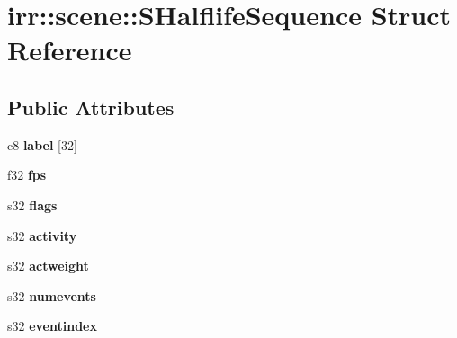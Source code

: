 \hypertarget{structirr_1_1scene_1_1_s_halflife_sequence}{\section{irr\-:\-:scene\-:\-:S\-Halflife\-Sequence Struct Reference}
\label{structirr_1_1scene_1_1_s_halflife_sequence}
}
\subsection*{Public Attributes}
\begin{DoxyCompactItemize}
\item 
\hypertarget{structirr_1_1scene_1_1_s_halflife_sequence_a8e4b2f0fbcae1e8da5a95c1e23ba1d75}{c8 {\bfseries label} \mbox{[}32\mbox{]}}\label{structirr_1_1scene_1_1_s_halflife_sequence_a8e4b2f0fbcae1e8da5a95c1e23ba1d75}

\item 
\hypertarget{structirr_1_1scene_1_1_s_halflife_sequence_a62d5452cc65df8479bbe4572c56482ee}{f32 {\bfseries fps}}\label{structirr_1_1scene_1_1_s_halflife_sequence_a62d5452cc65df8479bbe4572c56482ee}

\item 
\hypertarget{structirr_1_1scene_1_1_s_halflife_sequence_a9a511f19c947075c2ef98cb2e371e69e}{s32 {\bfseries flags}}\label{structirr_1_1scene_1_1_s_halflife_sequence_a9a511f19c947075c2ef98cb2e371e69e}

\item 
\hypertarget{structirr_1_1scene_1_1_s_halflife_sequence_af0930644a76d484f352dc6eef709bf8f}{s32 {\bfseries activity}}\label{structirr_1_1scene_1_1_s_halflife_sequence_af0930644a76d484f352dc6eef709bf8f}

\item 
\hypertarget{structirr_1_1scene_1_1_s_halflife_sequence_aa16ac68e1c1af91b43051e577bf3a1b5}{s32 {\bfseries actweight}}\label{structirr_1_1scene_1_1_s_halflife_sequence_aa16ac68e1c1af91b43051e577bf3a1b5}

\item 
\hypertarget{structirr_1_1scene_1_1_s_halflife_sequence_ac4908b8c20b8ac0279f511df72a7ed0b}{s32 {\bfseries numevents}}\label{structirr_1_1scene_1_1_s_halflife_sequence_ac4908b8c20b8ac0279f511df72a7ed0b}

\item 
\hypertarget{structirr_1_1scene_1_1_s_halflife_sequence_a5ad17422a2357bf68716adadea43de79}{s32 {\bfseries eventindex}}\label{structirr_1_1scene_1_1_s_halflife_sequence_a5ad17422a2357bf68716adadea43de79}


\end{DoxyCompactItemize}
